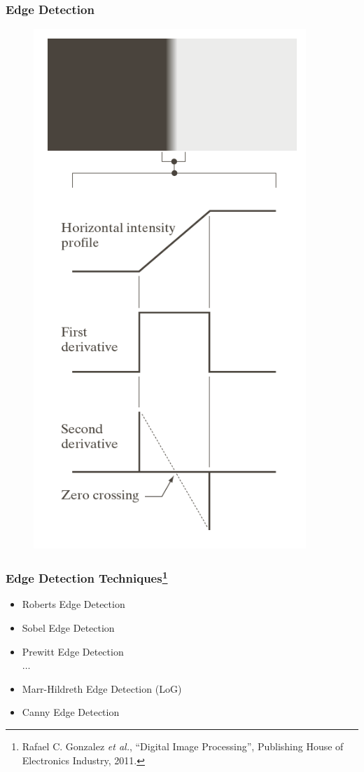 \documentclass[notheorems,serif,table,compress]{beamer}  %
\begin{document}
\begin{frame}
\frametitle{Edge Detection}
    \begin{figure}
    \includegraphics[width=0.35\linewidth]{jiance.png} 
    \end{figure}
\end{frame}


\begin{frame}
\frametitle{Edge Detection Techniques\footnote{Rafael C. Gonzalez \textit{et al.}, ``Digital Image Processing'', Publishing House of Electronics Industry, 2011. }}
    \begin{itemize}
        \item Roberts Edge Detection
        \item Sobel Edge Detection
        \item Prewitt Edge Detection\\
        $\dots$\newline
        
        \item Marr-Hildreth Edge Detection (LoG)
        \item Canny Edge Detection
    \end{itemize}
\end{frame}
\end{document}
